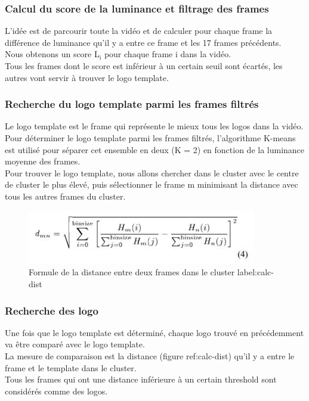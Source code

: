 \documentclass[11pt]{article}
\begin{document}
\subsubsection{Calcul du score de la luminance et filtrage des frames}
\label{sec:org06d3c85}
L'idée est de parcourir toute la vidéo et de calculer pour chaque frame la différence de luminance qu'il y a entre ce frame et les 17 frames précédents.\\
Nous obtenons un score L\(_{\text{i}}\) pour chaque frame i dans la vidéo.\\
Tous les frames dont le score est inférieur à un certain seuil sont écartés, les autres vont servir à trouver le logo template.\\

\subsubsection{Recherche du logo template parmi les frames filtrés}
\label{sec:orgcacf51f}
Le logo template est le frame qui représente le mieux tous les logos dans la vidéo.\\
Pour déterminer le logo template parmi les frames filtrés, l'algorithme K-means est utilisé pour séparer cet ensemble en deux (K = 2) en fonction de la luminance moyenne des frames.\\
Pour trouver le logo template, nous allons chercher dans le cluster avec le centre de cluster le plus élevé, puis sélectionner le frame m minimisant la distance avec tous les autres frames du cluster.\\

\begin{figure}[htbp]
\centering
\includegraphics[width=10cm]{robust_calc_dist.JPG}
\caption{Formule de la distance entre deux frames dans le cluster label:calc-dist}
\end{figure}


\subsubsection{Recherche des logo}
\label{sec:orgf0f813a}
Une fois que le logo template est déterminé, chaque logo trouvé en précédemment va être comparé avec le logo template.\\
La mesure de comparaison est la distance (figure ref:calc-dist) qu'il y a entre le frame et le template dans le cluster.\\
Tous les frames qui ont une distance inférieure à un certain threshold sont considérés comme des logos.\\
\end{document}
